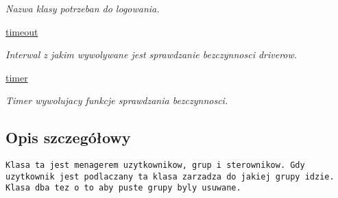 \begin{CompactItemize}
\begin{CompactList}\small\item\em Nazwa klasy potrzeban do logowania. \item\end{CompactList}\item 
\hypertarget{class_serv_1_1_user_group_manager_1_1_user_group_manager_6d1397abb7d1a348168cd3ea4cb16432}{
\hyperlink{class_serv_1_1_user_group_manager_1_1_user_group_manager_6d1397abb7d1a348168cd3ea4cb16432}{timeout}}
\label{class_serv_1_1_user_group_manager_1_1_user_group_manager_6d1397abb7d1a348168cd3ea4cb16432}

\begin{CompactList}\small\item\em Interwal z jakim wywolywane jest sprawdzanie bezczynnosci driverow. \item\end{CompactList}\item 
\hypertarget{class_serv_1_1_user_group_manager_1_1_user_group_manager_534b37d7ca767e54fd1caa758ee66520}{
\hyperlink{class_serv_1_1_user_group_manager_1_1_user_group_manager_534b37d7ca767e54fd1caa758ee66520}{timer}}
\label{class_serv_1_1_user_group_manager_1_1_user_group_manager_534b37d7ca767e54fd1caa758ee66520}

\begin{CompactList}\small\item\em Timer wywolujacy funkcje sprawdzania bezczynnosci. \item\end{CompactList}\end{CompactItemize}


\subsection{Opis szczegółowy}


\footnotesize\begin{verbatim}Klasa ta jest menagerem uzytkownikow, grup i sterownikow. Gdy uzytkownik jest podlaczany ta klasa zarzadza do jakiej grupy idzie.
Klasa dba tez o to aby puste grupy byly usuwane.    
\end{verbatim}
\normalsize
 

